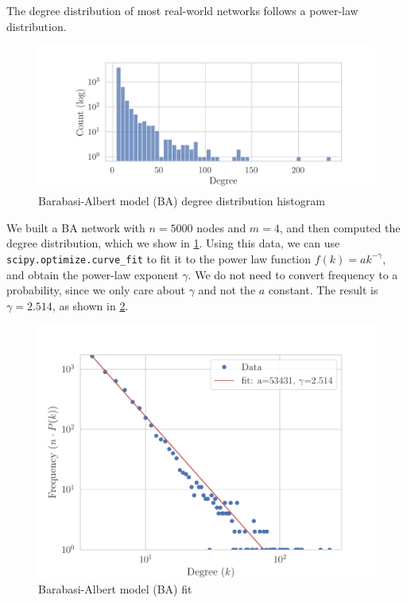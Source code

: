 The degree distribution of most real-world networks follows a power-law distribution.

\begin{figure}[H]
    \includegraphics{figures/ba_dist_log.png}
    \caption{Barabasi-Albert model (BA) degree distribution histogram}%
    \label{fig:ba_degree_dist}%
\end{figure}

We built a BA network with $n=5000$ nodes and $m=4$, and then computed the degree distribution,
which we show in \cref{fig:ba_degree_dist}. Using this data, we can use \texttt{scipy.optimize.curve\_fit}
to fit it to the power law function $f(k) = a k^{-\gamma}$, and obtain the power-law exponent $\gamma$.
We do not need to convert frequency to a probability, since we only care about $\gamma$ and not
the $a$ constant. The result is $\gamma=2.514$, as shown in \cref{fig:ba_fit}.

\begin{figure}[H]
    \includegraphics{figures/ba_fit}
    \caption{Barabasi-Albert model (BA) fit}%
    \label{fig:ba_fit}%
\end{figure}
